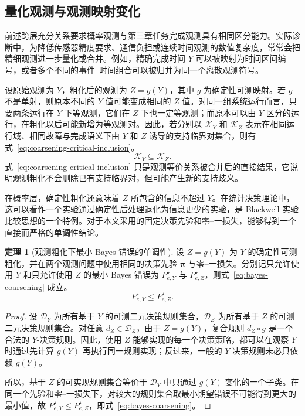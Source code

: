 \documentclass[master,fontset=ubuntu]{shnuthesis}
\theoremstyle{definition}
\newtheorem{thesistheorem}{定理}
\begin{document}
\subsection{量化观测与观测映射变化}

前述跨层充分关系要求概率观测与第三章任务完成观测具有相同区分能力。实际诊断中，为降低传感器精度要求、通信负担或连续时间观测的数值复杂度，常常会把精细观测进一步量化或合并。例如，精确完成时间 \(Y\) 可以被映射为时间区间编号，或者多个不同的事件--时间组合可以被归并为同一个离散观测符号。

设原始观测为 \(Y\)，粗化后的观测为 \(Z=g(Y)\)，其中 \(g\) 为确定性可测映射。若 \(g\) 不是单射，则原本不同的 \(Y\) 值可能变成相同的 \(Z\) 值。对同一组系统运行而言，只要两条运行在 \(Y\) 下等观测，它们在 \(Z\) 下也一定等观测；而原本可以由 \(Y\) 区分的运行，在粗化以后可能新增为等观测对。因此，若分别以 \(\mathcal K_Y\) 和 \(\mathcal K_Z\) 表示在相同运行域、相同故障与完成语义下由 \(Y\) 和 \(Z\) 诱导的支持临界对集合，则有式~\eqref{eq:coarsening-critical-inclusion}。
\begin{equation}
\mathcal K_Y
\subseteq
\mathcal K_Z.
\label{eq:coarsening-critical-inclusion}
\end{equation}
式~\eqref{eq:coarsening-critical-inclusion} 只是观测等价关系被合并后的直接结果，它说明观测粗化不会删除已有支持临界对，但可能产生新的支持歧义。

在概率层，确定性粗化还意味着 \(Z\) 所包含的信息不超过 \(Y\)。在统计决策理论中，这可以看作一个实验通过确定性后处理退化为信息更少的实验，是 Blackwell 实验比较思想的一个特例\cite{Blackwell1953}。对于本文采用的固定决策先验和零--一损失，能够得到一个直接而严格的单调性结论。

\begin{thesistheorem}[观测粗化下最小 Bayes 错误的单调性]
\label{thm:bayes-coarsening}
设 \(Z=g(Y)\) 为 \(Y\) 的确定性可测粗化，并在两个观测问题中使用相同的决策先验 \(\boldsymbol\pi\) 与零--一损失。分别记只允许使用 \(Y\) 和只允许使用 \(Z\) 的最小 Bayes 错误为 \(P_{e,Y}^\star\) 与 \(P_{e,Z}^\star\)，则式~\eqref{eq:bayes-coarsening} 成立。
\begin{equation}
P_{e,Y}^\star
\leq
P_{e,Z}^\star.
\label{eq:bayes-coarsening}
\end{equation}
\end{thesistheorem}

\begin{proof}
设 \(\mathcal D_Y\) 为所有基于 \(Y\) 的可测二元决策规则集合，\(\mathcal D_Z\) 为所有基于 \(Z\) 的可测二元决策规则集合。对任意 \(d_Z\in\mathcal D_Z\)，由于 \(Z=g(Y)\)，复合规则 \(d_Z\circ g\) 是一个合法的 \(Y\)-决策规则。因此，使用 \(Z\) 能够实现的每一个决策策略，都可以在观察 \(Y\) 时通过先计算 \(g(Y)\) 再执行同一规则实现；反过来，一般的 \(Y\)-决策规则未必只依赖 \(g(Y)\)。

所以，基于 \(Z\) 的可实现规则集合等价于 \(\mathcal D_Y\) 中只通过 \(g(Y)\) 变化的一个子类。在同一个先验和零--一损失下，对较大的规则集合取最小期望错误不可能得到更大的最小值，故 \(P_{e,Y}^\star\leq P_{e,Z}^\star\)，即式~\eqref{eq:bayes-coarsening}。
\end{proof}
\end{document}
